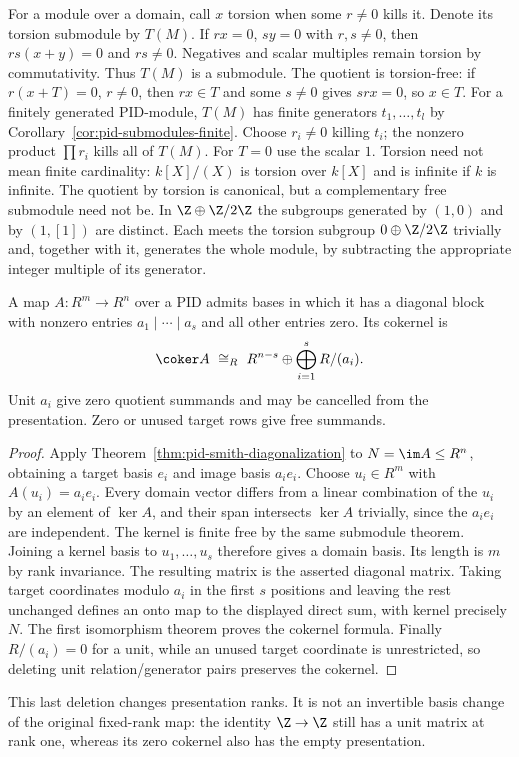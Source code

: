 For a module over a domain, call $x$ torsion when some $r\ne0$ kills
it. Denote its torsion submodule by $T(M)$.
If $rx=0$, $sy=0$ with $r,s\ne0$, then $rs(x+y)=0$ and $rs\ne0$.
Negatives and scalar multiples remain torsion by commutativity.
Thus $T(M)$ is a submodule. The quotient is torsion-free: if
$r(x+T)=0$, $r\ne0$, then $rx\in T$ and some $s\ne0$ gives
$srx=0$, so $x\in T$.
For a finitely generated PID-module, $T(M)$ has finite generators
$t_1,\ldots,t_l$ by Corollary~\ref{cor:pid-submodules-finite}.
Choose $r_i\ne0$ killing $t_i$; the nonzero product $\prod r_i$
kills all of $T(M)$. For $T=0$ use the scalar $1$.
Torsion need not mean finite cardinality: $k[X]/(X)$ is torsion over
$k[X]$ and is infinite if $k$ is infinite.
The quotient by torsion is canonical, but a complementary free submodule
need not be. In $\Z\oplus\Z/2\Z$ the subgroups generated by $(1,0)$
and by $(1,[1])$ are distinct. Each meets the torsion subgroup
$0\oplus\Z/2\Z$ trivially and, together with it, generates the whole
module, by subtracting the appropriate integer multiple of its generator.

\begin{corollary}\label{cor:pid-presentation-cokernel}
A map $A:R^m\to R^n$ over a PID admits bases in which it has a
diagonal block with nonzero entries $a_1\mid\cdots\mid a_s$ and
all other entries zero. Its cokernel is
\[
 \coker A\ \cong_R\ R^{n-s}\oplus\bigoplus_{i=1}^s R/(a_i).
\]
Unit $a_i$ give zero quotient summands and may be cancelled from the
presentation. Zero or unused target rows give free summands.
\end{corollary}
\begin{proof}
Apply Theorem~\ref{thm:pid-smith-diagonalization} to
$N=\im A\le R^n$, obtaining a target basis $e_i$ and image basis
$a_i e_i$. Choose $u_i\in R^m$ with $A(u_i)=a_i e_i$.
Every domain vector differs from a linear combination of the $u_i$
by an element of $\ker A$, and their span intersects $\ker A$ trivially,
since the $a_i e_i$ are independent.
The kernel is finite free by the same submodule theorem.
Joining a kernel basis to $u_1,\ldots,u_s$ therefore gives a domain
basis. Its length is $m$ by rank invariance.
The resulting matrix is the asserted diagonal matrix.
Taking target coordinates modulo $a_i$ in the first $s$ positions and
leaving the rest unchanged defines an onto map to the displayed direct
sum, with kernel precisely $N$. The first isomorphism theorem proves
the cokernel formula.
Finally $R/(a_i)=0$ for a unit, while an unused target coordinate is
unrestricted, so deleting unit relation/generator pairs preserves the
cokernel.
\end{proof}
This last deletion changes presentation ranks. It is not an invertible
basis change of the original fixed-rank map: the identity $\Z\to\Z$
still has a unit matrix at rank one, whereas its zero cokernel also has
the empty presentation.


